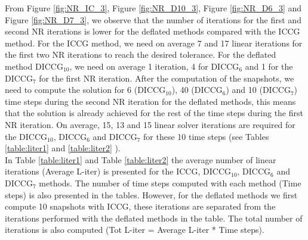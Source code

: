 \documentclass[12pt]{article}
\numberwithin{equation}{section}
\begin{document}
From Figure \ref{fig:NR_IC_3}, Figure \ref{fig:NR_D10_3}, Figure \ref{fig:NR_D6_3} and Figure \ref{fig:NR_D7_3}, we observe that the number of iterations for the first and second NR iterations is lower for the deflated methods compared with the ICCG method. For the ICCG method, we need on average 7 and 17 linear iterations for the first two NR iterations to reach the desired tolerance. For the deflated method DICCG$_{10}$, we need on average 1 iteration, 4 for DICCG$_6$ and 1 for the DICCG$_7$ for the first NR iteration. After the computation of the snapshots, we need to compute the solution for 6 (DICCG$_{10}$), 40 (DICCG$_{6}$) and 10 (DICCG$_{7}$) time steps during the second NR iteration for the deflated methods, this means that the solution is already achieved for the rest of the time steps during the first NR iteration. On average, 15, 13 and 15 linear solver iterations are required for the DICCG$_{10}$, DICCG$_6$ and DICCG$_7$ for these 10 time steps (see Tables \ref{table:liter1} and \ref{table:liter2} ). \\
In Table \ref{table:liter1} and Table \ref{table:liter2} the average number of linear iterations (Average L-iter) is presented for the ICCG, DICCG$_{10}$, DICCG$_6$ and DICCG$_7$ methods. The number of time steps computed with each method (Time steps) is also presented in the tables. However, for the deflated methods we first compute 10 snapshots with ICCG, these iterations are separated from the iterations performed with the deflated methods in the table. The total number of iterations is also computed (Tot L-iter = Average L-iter * Time steps). 
\end{document}
